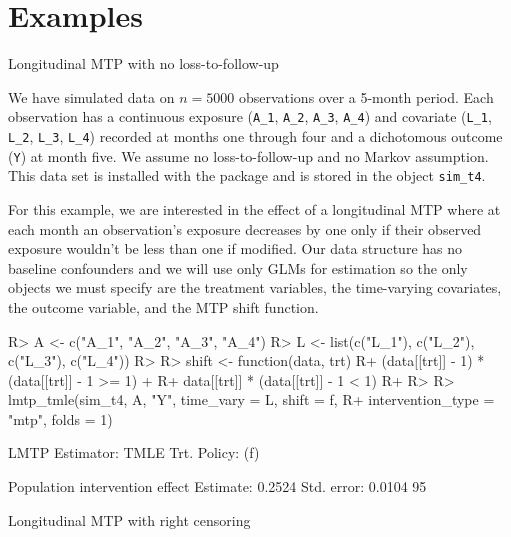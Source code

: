 \documentclass[twoside,11pt]{article}
\newenvironment{CodeChunk}{}{}
\let\code=\texttt
\begin{document}
\hypertarget{examples}{\section{Examples}\label{examples}}

\hypertarget{example-1-longitudinal-mtp-with-no-loss-to-follow-up}{
\begin{example}{Longitudinal MTP with no loss-to-follow-up}
\end{example}}

We have simulated data on \(n = 5000\) observations over a 5-month period. Each observation has a continuous exposure (\code{A\_1}, \code{A\_2}, \code{A\_3}, \code{A\_4}) and covariate (\code{L\_1}, \code{L\_2}, \code{L\_3}, \code{L\_4}) recorded at months one through four and a dichotomous outcome (\code{Y}) at month five. We assume no loss-to-follow-up and no Markov assumption. This data set is installed with the package and is stored in the object \code{sim\_t4}.

For this example, we are interested in the effect of a longitudinal MTP where at each month an observation's exposure decreases by one only if their observed exposure wouldn't be less than one if modified. Our data structure has no baseline confounders and we will use only GLMs for estimation so the only objects we must specify are the treatment variables, the time-varying covariates, the outcome variable, and the MTP shift function.

\begin{CodeChunk}
\begin{CodeInput}
R> A <- c("A_1", "A_2", "A_3", "A_4")
R> L <- list(c("L_1"), c("L_2"), c("L_3"), c("L_4"))
R> 
R> shift <- function(data, trt) {
R+   (data[[trt]] - 1) * (data[[trt]] - 1 >= 1) + 
R+     data[[trt]] * (data[[trt]] - 1 < 1)
R+ }
R> 
R> lmtp_tmle(sim_t4, A, "Y", time_vary = L, shift = f, 
R+           intervention_type = "mtp", folds = 1)
\end{CodeInput}

\begin{CodeOutput}
LMTP Estimator: TMLE
   Trt. Policy: (f)

Population intervention effect
      Estimate: 0.2524
    Std. error: 0.0104
        95%
\end{CodeOutput}
\end{CodeChunk}

\hypertarget{example-2-longitudinal-mtp-right-censoring}{
\begin{example}{Longitudinal MTP with right censoring}
\end{example}}
\end{document}
